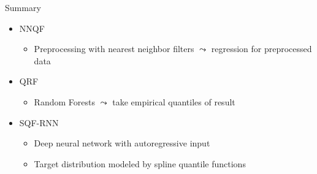 \documentclass[10pt,aspectratio=169]{beamer}
\begin{document}
\begin{frame}{Summary}
    \begin{itemize}
        \item NNQF
        \begin{itemize}
            \item Preprocessing with nearest neighbor filters \(\leadsto\) regression for preprocessed data
        \end{itemize}
        \item QRF
        \begin{itemize}
            \item Random Forests \(\leadsto\) take empirical quantiles of result
        \end{itemize}
        \item SQF-RNN
        \begin{itemize}
            \item Deep neural network with autoregressive input
            \item Target distribution modeled by spline quantile functions
        \end{itemize}
    \end{itemize}
\end{frame}
\end{document}

